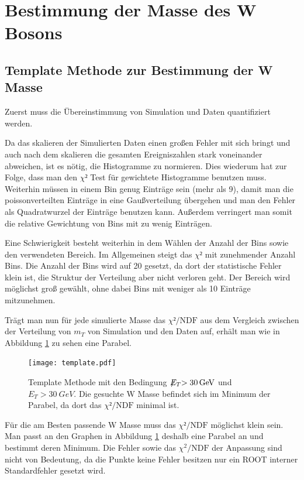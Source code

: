 \documentclass[a4paper,12pt]{article}
\newcommand{\met}{\ensuremath{\not\mathrel{E}}_T}
\begin{document}
\newpage
\section{Bestimmung der Masse des W Bosons}
\subsection{Template Methode zur Bestimmung der W Masse}
Zuerst muss die Übereinstimmung von Simulation und Daten quantifiziert werden.

Da das skalieren der Simulierten Daten einen großen Fehler mit sich bringt und auch nach dem
skalieren die gesamten Ereigniszahlen stark voneinander abweichen, ist es nötig, die Histogramme zu
normieren. Dies wiederum hat zur Folge, dass man den $χ²$ Test für gewichtete Histogramme benutzen
muss\cite{cramer1999mathematical}.
Weiterhin müssen in einem Bin genug
Einträge sein (mehr als 9), damit man die poissonverteilten Einträge in eine Gaußverteilung 
übergehen und man den Fehler als Quadratwurzel der Einträge benutzen kann. Außerdem verringert man
somit die relative Gewichtung von Bins mit zu wenig Einträgen.



Eine Schwierigkeit besteht weiterhin in dem Wählen der Anzahl der Bins sowie den verwendeten
Bereich. Im Allgemeinen steigt das $χ²$ mit zunehmender Anzahl Bins. Die Anzahl der Bins wird auf
20 gesetzt, da dort der statistische Fehler klein ist, die Struktur der Verteilung aber nicht
verloren geht. Der Bereich wird möglichst groß gewählt, ohne dabei Bins mit weniger als 10 Einträge
mitzunehmen.

Trägt man nun für jede simulierte Masse das $χ²/\text{NDF}$ aus dem Vergleich zwischen der
Verteilung von $m_T$ von
Simulation und den Daten auf, erhält man wie in Abbildung \ref{fig:template} zu sehen eine Parabel.

\begin{figure}[htb]
	\centering
	\texttt{[image: template.pdf]}
	\caption{Template Methode mit den Bedingung $\met > \SI{30}{GeV}$ und $E_{T} > \SI{30}{GeV}$. Die gesuchte W Masse befindet sich im Minimum der Parabel, da dort
		das $χ²/\text{NDF}$ minimal ist.}
	\label{fig:template}
\end{figure}

Für die am Besten passende W Masse muss das $χ²/\text{NDF}$ möglichst klein sein. Man passt an den
Graphen in Abbildung \ref{fig:template} deshalb eine Parabel an und bestimmt deren Minimum. Die
Fehler sowie das $χ^2/\text{NDF}$ der Anpassung sind nicht von Bedeutung, da die Punkte keine
Fehler besitzen nur ein ROOT interner Standardfehler gesetzt wird.
\end{document}
